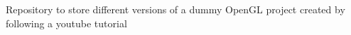 Repository to store different versions of a dummy Open\+GL project created by following a youtube tutorial 